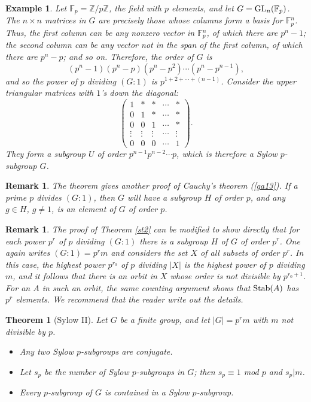 \documentclass[a4paper,11pt,final,openany]{memoir}%
\newtheorem{theorem}[X]{Theorem}
\newtheorem{example}[X]{Example}
\newtheorem{remark}[X]{Remark}
\theoremstyle{nonumberplain}
\begin{document}
\begin{example}
\label{st5} Let $\mathbb{F}_{p}=\mathbb{Z}/p\mathbb{Z}$, the field with $p$
elements, and let $G=\operatorname{GL}_{n}(\mathbb{F}_{p})$. The $n\times n$ matrices in $G$
are precisely those whose columns form a basis for $\mathbb{F}{}_{p}^{n}$.
Thus, the first column can be any nonzero vector in $\mathbb{F}{}_{p}^{n}$, of
which there are $p^{n}-1$; the second column can be any vector not in the span
of the first column, of which there are $p^{n}-p$; and so on. Therefore, the
order of $G$ is%
\[
(p^{n}-1)(p^{n}-p)(p^{n}-p^{2})\cdots(p^{n}-p^{n-1}),
\]
and so the power of $p$ dividing $(G:1)$ is $p^{1+2+\cdots+(n-1)}$. Consider
the upper triangular matrices with $1$'s down the diagonal:
\[%
\begin{pmatrix}
1 & \ast & \ast & \cdots & \ast\\
0 & 1 & \ast & \cdots & \ast\\
0 & 0 & 1 & \cdots & \ast\\
\vdots & \vdots & \vdots & \cdots & \vdots\\
0 & 0 & 0 & \cdots & 1
\end{pmatrix}
.
\]
They form a subgroup $U$ of order $p^{n-1}p^{n-2}\cdots p$, which is therefore
a Sylow $p$-subgroup $G$.
\end{example}

\begin{remark}
\label{st4}The theorem gives another proof of Cauchy's theorem (\ref{ga13}).
If a prime $p$ divides $(G\colon1)$, then $G$ will have a subgroup $H$ of
order $p$, and any $g\in H$, $g\neq1$, is an element of $G$ of order $p$.
\end{remark}

\begin{remark}
\label{st3}The proof of Theorem \ref{st2} can be modified to show directly
that for each power $p^{r}$ of $p$ dividing $(G:1)$ there is a subgroup $H$ of
$G$ of order $p^{r}$. One again writes $(G:1)=p^{r}m$ and considers the set
$X$ of all subsets of order $p^{r}$. In this case, the highest power
$p^{r_{0}}$ of $p$ dividing $|X|$ is the highest power of $p$ dividing $m$,
and it follows that there is an orbit in $X$ whose order is not divisible by
$p^{r_{0}+1}$. For an $A$ in such an orbit, the same counting argument shows
that $\operatorname{Stab}(A)$ has $p^{r}$ elements. We recommend that the reader write out
the details.
\end{remark}

\begin{theorem}
[Sylow II]\label{st7}%
%
Let $G$ be a finite group, and let $|G|=p^{r}m$ with $m$ not divisible by $p$.

\begin{itemize}
\item[(a)] Any two Sylow $p$-subgroups are conjugate.

\item[(b)] Let $s_{p}$ be the number of Sylow $p$-subgroups in $G$; then
$s_{p}\equiv1$ mod $p$ and $s_{p}|m$.

\item[(c)] Every $p$-subgroup of $G$ is contained in a Sylow $p$-subgroup.
\end{itemize}
\end{theorem}
\end{document}
